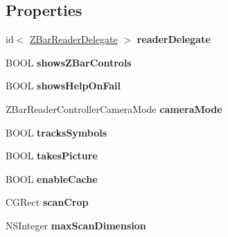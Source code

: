 \subsection*{Properties}
\begin{DoxyCompactItemize}
\item 
\hypertarget{interface_z_bar_reader_controller_ab93a9730152d5f5c09173c1b68e1551d}{
id$<$ \hyperlink{protocol_z_bar_reader_delegate-p}{ZBarReaderDelegate} $>$ {\bfseries readerDelegate}}
\label{interface_z_bar_reader_controller_ab93a9730152d5f5c09173c1b68e1551d}

\item 
\hypertarget{interface_z_bar_reader_controller_a9aaf51094b09af514b04a0a6fab7cc4b}{
BOOL {\bfseries showsZBarControls}}
\label{interface_z_bar_reader_controller_a9aaf51094b09af514b04a0a6fab7cc4b}

\item 
\hypertarget{interface_z_bar_reader_controller_a22ca46d7e965b388de5e42455c574707}{
BOOL {\bfseries showsHelpOnFail}}
\label{interface_z_bar_reader_controller_a22ca46d7e965b388de5e42455c574707}

\item 
\hypertarget{interface_z_bar_reader_controller_a75e762c1c96d6e4cf991d777bedb13ef}{
ZBarReaderControllerCameraMode {\bfseries cameraMode}}
\label{interface_z_bar_reader_controller_a75e762c1c96d6e4cf991d777bedb13ef}

\item 
\hypertarget{interface_z_bar_reader_controller_abc0af09f1e52f50aa968a74f3271337c}{
BOOL {\bfseries tracksSymbols}}
\label{interface_z_bar_reader_controller_abc0af09f1e52f50aa968a74f3271337c}

\item 
\hypertarget{interface_z_bar_reader_controller_a77ad7c83c822392200e68c13ba4b7590}{
BOOL {\bfseries takesPicture}}
\label{interface_z_bar_reader_controller_a77ad7c83c822392200e68c13ba4b7590}

\item 
\hypertarget{interface_z_bar_reader_controller_a6446ca41977096656015cf1902588698}{
BOOL {\bfseries enableCache}}
\label{interface_z_bar_reader_controller_a6446ca41977096656015cf1902588698}

\item 
\hypertarget{interface_z_bar_reader_controller_a39afcc08b8b856cb1c6362bf46f3c376}{
CGRect {\bfseries scanCrop}}
\label{interface_z_bar_reader_controller_a39afcc08b8b856cb1c6362bf46f3c376}

\item 
\hypertarget{interface_z_bar_reader_controller_a7aa8134e98f23c76125be6b7d1837bd8}{
NSInteger {\bfseries maxScanDimension}}
\label{interface_z_bar_reader_controller_a7aa8134e98f23c76125be6b7d1837bd8}

\end{DoxyCompactItemize}


